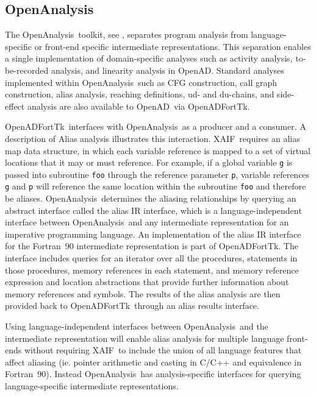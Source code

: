 \documentclass[11pt]{article}
\newcommand{\OpenAD}{OpenAD}
\newcommand{\OpenADFortTk}{OpenADFortTk}
\newcommand{\OpenAnalysis}{OpenAnalysis}
\newcommand{\xaif}{XAIF}
\begin{document}
\subsection{\OpenAnalysis} \label{ssec:openanalysis}

The \OpenAnalysis\ toolkit, see \cite{oaWeb}, separates program
analysis from language-specific or front-end specific intermediate
representations.  This separation enables a single implementation of
domain-specific analyses such as activity analysis, to-be-recorded
analysis, and linearity analysis in \OpenAD.  Standard analyses
implemented within \OpenAnalysis\ such as CFG construction, call graph
construction, alias analysis, reaching definitions, ud- and du-chains,
and side-effect analysis are also available to \OpenAD\ via
\OpenADFortTk.

\OpenADFortTk\ interfaces with \OpenAnalysis\ as a producer and a
consumer.  A description of Alias analysis illustrates this
interaction.  \xaif\ requires an alias map data structure, in which
each variable reference is mapped to a set of virtual locations that
it may or must reference.  For example, if a global variable {\tt g}
is passed into subroutine {\tt foo} through the reference parameter
{\tt p}, variable references {\tt g} and {\tt p} will reference the
same location within the subroutine {\tt foo} and therefore be aliases.  
\OpenAnalysis\ determines the aliasing relationships by querying an
abstract interface called the alias IR interface, which is a 
language-independent interface between \OpenAnalysis\ and any
intermediate representation for an imperative programming language.  
An implementation of the alias IR interface for the Fortran~90
intermediate representation is part of
\OpenADFortTk.  The interface includes queries for an iterator over
all the procedures, statements in those procedures, memory references
in each statement, and memory reference expression and location
abstractions that provide further information about memory references
and symbols.  The results of the alias analysis are then provided back
to \OpenADFortTk\ through an alias results interface.

Using language-independent interfaces between \OpenAnalysis\ and the
intermediate representation will enable alias analysis for multiple
language front-ends without requiring \xaif\ to include the union of
all language features that affect aliasing (ie. pointer arithmetic and
casting in C/C++ and equivalence in Fortran~90).  Instead
\OpenAnalysis\ has analysis-specific interfaces for querying
language-specific intermediate representations.
\end{document}
